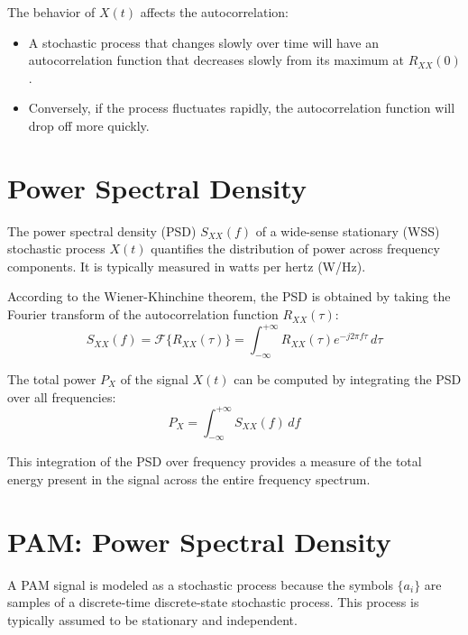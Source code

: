 The behavior of \( X(t) \) affects the autocorrelation:
\begin{itemize}
    \item A stochastic process that changes slowly over time will have an autocorrelation function that decreases slowly from its maximum at \( R_{XX}(0) \).
    \item Conversely, if the process fluctuates rapidly, the autocorrelation function will drop off more quickly.
\end{itemize}

\section*{Power Spectral Density}

The power spectral density (PSD) \( S_{XX}(f) \) of a wide-sense stationary (WSS) stochastic process \( X(t) \) quantifies the distribution of power across frequency components. It is typically measured in watts per hertz (W/Hz).

According to the Wiener-Khinchine theorem, the PSD is obtained by taking the Fourier transform of the autocorrelation function \( R_{XX}(\tau) \):
\[ S_{XX}(f) = \mathcal{F}\{R_{XX}(\tau)\} = \int_{-\infty}^{+\infty} R_{XX}(\tau)e^{-j2\pi f\tau} \, d\tau \]

The total power \( P_X \) of the signal \( X(t) \) can be computed by integrating the PSD over all frequencies:
\[ P_X = \int_{-\infty}^{+\infty} S_{XX}(f) \, df \]

This integration of the PSD over frequency provides a measure of the total energy present in the signal across the entire frequency spectrum.


\section*{PAM: Power Spectral Density}

A PAM signal is modeled as a stochastic process because the symbols \( \{a_i\} \) are samples of a discrete-time discrete-state stochastic process. This process is typically assumed to be stationary and independent.

